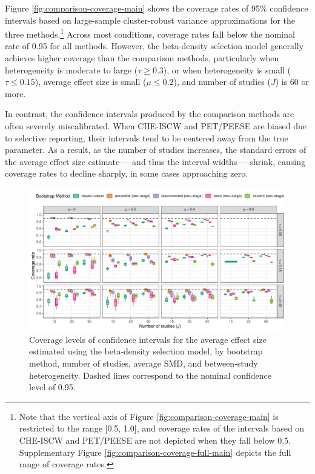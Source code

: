 \documentclass[
  american,
  man, donotrepeattitle,floatsintext]{apa7}
\begin{document}
Figure \ref{fig:comparison-coverage-main} shows the coverage rates of 95\% confidence intervals based on large-sample cluster-robust variance approximations for the three methods.\footnote{Note that the vertical axis of Figure \ref{fig:comparison-coverage-main} is restricted to the range {[}0.5, 1.0{]}, and coverage rates of the intervals based on CHE-ISCW and PET/PEESE are not depicted when they fall below 0.5. Supplementary Figure \ref{fig:comparison-coverage-full-main} depicts the full range of coverage rates.}
Across most conditions, coverage rates fall below the nominal rate of 0.95 for all methods. However, the beta-density selection model generally achieves higher coverage than the comparison methods, particularly when heterogeneity is moderate to large (\(\tau \geq 0.3\)), or when heterogeneity is small (\(\tau \leq 0.15\)), average effect size is small (\(\mu \leq 0.2\)), and number of studies (\(J\)) is 60 or more.

In contrast, the confidence intervals produced by the comparison methods are often severely miscalibrated. When CHE-ISCW and PET/PEESE are biased due to selective reporting, their intervals tend to be centered away from the true parameter. As a result, as the number of studies increases, the standard errors of the average effect size estimate-----and thus the interval widths-----shrink, causing coverage rates to decline sharply, in some cases approaching zero.

\begin{figure}
\includegraphics{beta-function-selection-models-with-dependent-effects_files/figure-latex/Beta-coverage-main-1} \caption{Coverage levels of confidence intervals for the average effect size estimated using the beta-density selection model, by bootstrap method, number of studies, average SMD, and between-study heterogeneity. Dashed lines correspond to the nominal confidence level of 0.95.}\label{fig:Beta-coverage-main}
\end{figure}
\end{document}
